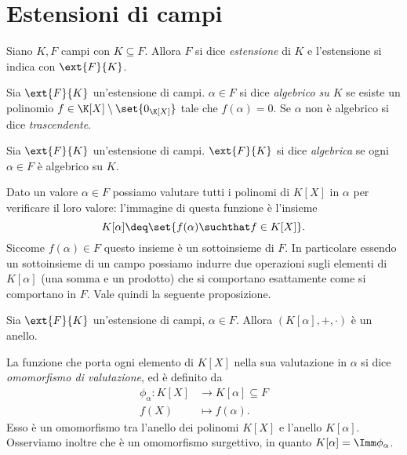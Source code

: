 \section{Estensioni di campi}

\begin{definition}
     Siano $K, F$ campi con $K \subseteq F$. Allora $F$ si dice \emph{estensione} di $K$ e l'estensione si indica con $\ext{F}{K}$.
\end{definition}

\begin{definition}
     Sia $\ext{F}{K}$ un'estensione di campi. $\alpha \in F$ si dice \emph{algebrico su $K$} se esiste un polinomio $f \in \K[X] \setminus \set{0_{\K[X]}}$ tale che $f(\alpha) = 0$. Se $\alpha$ non è algebrico si dice \emph{trascendente}.
\end{definition}

\begin{definition}
     Sia $\ext{F}{K}$ un'estensione di campi. $\ext{F}{K}$ si dice \emph{algebrica} se ogni $\alpha \in F$ è algebrico su $K$.
\end{definition}

Dato un valore $\alpha \in F$ possiamo valutare tutti i polinomi di $K[X]$ in $\alpha$ per verificare il loro valore: l'immagine di questa funzione è l'insieme \[
    K[\alpha] \deq \set{f(\alpha) \suchthat f \in K[X]}.    
\] Siccome $f(\alpha) \in F$ questo insieme è un sottoinsieme di $F$. In particolare essendo un sottoinsieme di un campo possiamo indurre due operazioni sugli elementi di $K[\alpha]$ (una somma e un prodotto) che si comportano esattamente come si comportano in $F$. Vale quindi la seguente proposizione.

\begin{proposition}
    Sia $\ext{F}{K}$ un'estensione di campi, $\alpha \in F$. Allora $(K[\alpha], +, \cdot)$ è un anello.
\end{proposition}

La funzione che porta ogni elemento di $K[X]$ nella sua valutazione in $\alpha$ si dice \emph{omomorfismo di valutazione}, ed è definito da \begin{align*}
    \phi_\alpha : K[X] &\to K[\alpha] \subseteq F\\   
    f(X) &\mapsto f(\alpha).
\end{align*} Esso è un omomorfismo tra l'anello dei polinomi $K[X]$ e l'anello $K[\alpha]$. Osserviamo inoltre che è un omomorfismo surgettivo, in quanto $K[\alpha] = \Imm \phi_\alpha$.

